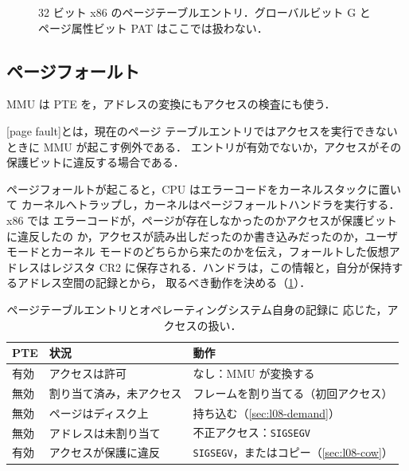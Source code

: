 \documentclass[../main.tex]{subfiles}
\begin{document}
\begin{figure}[htbp]
  \centering
  
  \caption{32 ビット x86 のページテーブルエントリ．グローバルビット G と
    ページ属性ビット PAT はここでは扱わない．}
  \label{fig:l08-pte}
\end{figure}

\subsection{ページフォールト}
\label{sec:l08-page-fault}

MMU は PTE を，アドレスの変換にもアクセスの検査にも使う．

\begin{definition}[ページフォールト]
  [page fault]とは，現在のページ
  テーブルエントリではアクセスを実行できないときに MMU が起こす例外である．
  エントリが有効でないか，アクセスがその保護ビットに違反する場合である．
\end{definition}

ページフォールトが起こると，CPU はエラーコードをカーネルスタックに置いて
カーネルへトラップし，カーネルはページフォールトハンドラを実行する．x86 では
エラーコードが，ページが存在しなかったのかアクセスが保護ビットに違反したの
か，アクセスが読み出しだったのか書き込みだったのか，ユーザモードとカーネル
モードのどちらから来たのかを伝え，フォールトした仮想アドレスはレジスタ CR2
に保存される．ハンドラは，この情報と，自分が保持するアドレス空間の記録とから，
取るべき動作を決める（\cref{tab:l08-faults}）．

\begin{table}[htbp]
  \centering
  \caption{ページテーブルエントリとオペレーティングシステム自身の記録に
    応じた，アクセスの扱い．}
  \label{tab:l08-faults}
  \small
  \begin{tabular}{@{}lll@{}}
    \toprule
    PTE & 状況 & 動作 \\
    \midrule
    有効   & アクセスは許可         & なし：MMU が変換する \\
    無効   & 割り当て済み，未アクセス & フレームを割り当てる（初回アクセス） \\
    無効   & ページはディスク上     & 持ち込む（\cref{sec:l08-demand}） \\
    無効   & アドレスは未割り当て   & 不正アクセス：\texttt{SIGSEGV} \\
    有効   & アクセスが保護に違反   & \texttt{SIGSEGV}，またはコピー（\cref{sec:l08-cow}） \\
    \bottomrule
  \end{tabular}
\end{table}
\end{document}
